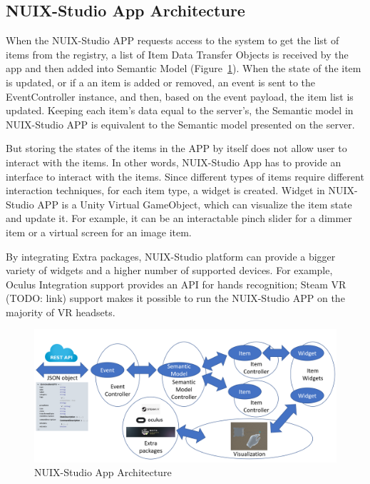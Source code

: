 \subsection{NUIX-Studio App Architecture}

When the NUIX-Studio APP requests access to the system to get the list of items from the registry, a list of Item Data Transfer Objects is received by the app and then added into Semantic Model (Figure~\ref{fig:AppArchitecture-figure}). When the state of the item is updated, or if a an item is added or removed, an event is sent to the EventController instance, and then, based on the event payload, the item list is updated.  Keeping each item's data equal to the server's, the Semantic model in NUIX-Studio APP is equivalent to the Semantic model presented on the server. 

But storing the states of the items in the APP by itself does not allow user to interact with the items. In other words, NUIX-Studio App has to provide an interface to interact with the items. Since different types of items require different interaction techniques, for each item type, a widget is created.
Widget in NUIX-Studio APP is a Unity Virtual GameObject, which can visualize the item state and update it. For example, it can be an interactable pinch slider for a dimmer item or a virtual screen for an image item.

By integrating Extra packages, NUIX-Studio platform can provide a bigger variety of widgets and a higher number of supported devices. For example, Oculus Integration support provides an API for hands recognition; Steam VR (TODO: link) support makes it possible to run the NUIX-Studio APP on the majority of VR headsets.

\begin{figure}
  \centering
  \includegraphics[width=0.9\linewidth]{figures/AppArchitecture.png}
  \caption{NUIX-Studio App Architecture}
  \label{fig:AppArchitecture-figure}
\end{figure}

